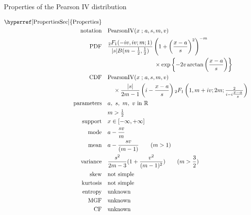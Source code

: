

\begin{table*}[t!]
 \caption[Pearson  IV distribution -- Properties]{Properties of the Pearson  IV distribution}

\begin{align*}
\text{\hyperref[PropertiesSec]{Properties}}  \quad& \\
\text{notation} \quad & \text{PearsonIV}(x \given a,s, m,v)  
\\
\text{PDF}\quad &    \frac{{}_{2}F_1(-i v, i v ; m;1)  }{|s| B(m-\frac{1}{2}, \frac{1}{2} )} \left( 1 +\left( \frac{x-a}{s}\right)^2 \right)^{-m}
\\ \notag & \qquad \qquad \qquad \qquad \times \exp \left\{ - 2 v \arctan \left( \frac{x-a}{s}\right) \right\}
\checked
\\
\text{CDF} \quad  &    \text{PearsonIV}(x\given a,s, m,v)  \\ & \quad  \times \frac{|s|}{2m-1}\left( i - \frac{x-a}{s}\right) {}_2F_1\left(1,m+iv; 2m; \tfrac{2}{i-i\tfrac{x-a}{s}} \right) \checked
\\
\text{parameters}\quad &   a,\  s,\  m,\ v \text{ in } \Real
\\ & m>\tfrac{1}{2}
\\
\text{support} \quad &   x \in [-\infty, + \infty]
\\
\text{mode} \quad  & a - \frac{sv}{m}  \checked
\\
\text{mean} \quad  &  a - \frac{sv}{(m-1)} \qquad (m>1) \checked
\\
\text{variance} \quad  & \frac{s^2}{2m-3} (1 + \frac{v^2}{(m-1)^2})  \qquad (m>\frac{3}{2}) \checked
\\
\text{skew} \quad  &  \text{not simple}
\\
\text{kurtosis} \quad  &  \text{not simple}
\\
\text{entropy} \quad  & \text{unknown}
\\
\text{MGF} \quad  &  \text{unknown}
\\
\text{CF} \quad  &  \text{unknown}
\end{align*}
\end{table*}






